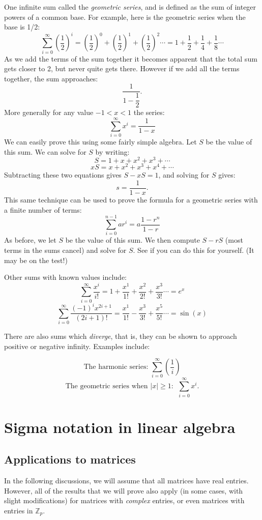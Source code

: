One infinite sum called the \emph{geometric series}, and is defined as the sum of integer powers of a common base.  For example, here is the geometric series when the base is 1/2:
\[\sum_{i=0}^{\infty}({\dfrac{1}{2}})^i=({\dfrac{1}{2}})^0+({\dfrac{1}{2}})^1+({\dfrac{1}{2}})^2\cdots = 1 + {\dfrac{1}{2}} + {\dfrac{1}{4}} + {\dfrac{1}{8}}\cdots\]
As we add the terms of the sum together it becomes apparent that the total sum gets closer to 2, but never quite gets there.  However if we add all the terms together, the sum approaches:
\[\dfrac{1}{1-\dfrac{1}{2}}.\]
More generally for any value $-1<x<1$ the series:
\[\sum_{i=0}^{\infty}x^i = \dfrac{1}{1-x}\]
We can easily prove this using some fairly simple algebra.  Let $S$ be the value of this sum.  We can solve for $S$  by writing:
 \[S=1+x+x^2+x^3+ \cdots \]
\[xS=x+x^2+x^3+x^4+ \cdots \] 
Subtracting these two equations gives $S-xS=1$, and solving for $S$ gives:
\[s=\dfrac{1}{1-x}. \]
This same technique can be used to prove the formula for a geometric series with a finite number of terms:
\[ \sum_{i=0}^{n-1} ar^i = a \dfrac{1-r^n}{1-r} \]
As before, we let $S$ be the value of this sum. We then compute $S - rS$ (most terms in the sums cancel) and solve for $S$.  See if you can do this for yourself.  (It may be on the test!)

Other sums with known values include:
\[\sum_{i=0}^{\infty}\dfrac{x^i}{i!} =1+\dfrac{x^1}{1!}+\dfrac{x^2}{2!}+\dfrac{x^3}{3!} \cdots=e^x\]
\[\sum_{i=0}^{\infty}\dfrac{(-1)^i x^{2i+1}}{(2i+1)!} = \dfrac{x^1}{1!}-\dfrac{x^3}{3!}+\dfrac{x^5}{5!}\cdots= \sin(x)\]

There are also sums which \emph{diverge}, that is, they can be shown to approach positive or negative infinity. Examples include:

\[\text{The harmonic series:  }\sum_{i=0}^{\infty}\left(\dfrac{1}{i} \right) \]
\[\text{The geometric series when~} |x| \ge 1: ~~\sum_{i=0}^{\infty} x^i. \]

\section{Sigma notation in linear algebra}

\subsection{Applications to matrices}

In the following discussions, we will assume that all matrices have real entries.  However, all of the results that we will prove also apply (in some cases, with slight modifications)  for matrices with \emph{complex} entries, or even matrices with entries in $\mathbb{Z}_p$.

